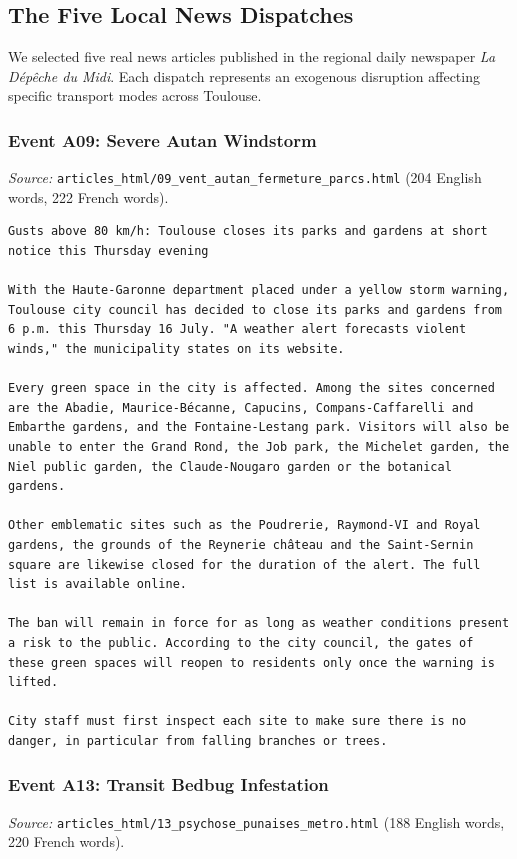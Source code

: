\subsection{The Five Local News Dispatches}

We selected five real news articles published in the regional daily newspaper \emph{La Dépêche du Midi}. Each dispatch represents an exogenous disruption affecting specific transport modes across Toulouse.

\subsubsection{Event A09: Severe Autan Windstorm}
\emph{Source:} \texttt{articles\_html/09\_vent\_autan\_fermeture\_parcs.html} (204 English words, 222 French words).

\begin{Verbatim}
Gusts above 80 km/h: Toulouse closes its parks and gardens at short notice this Thursday evening

With the Haute-Garonne department placed under a yellow storm warning, Toulouse city council has decided to close its parks and gardens from 6 p.m. this Thursday 16 July. "A weather alert forecasts violent winds," the municipality states on its website.

Every green space in the city is affected. Among the sites concerned are the Abadie, Maurice-Bécanne, Capucins, Compans-Caffarelli and Embarthe gardens, and the Fontaine-Lestang park. Visitors will also be unable to enter the Grand Rond, the Job park, the Michelet garden, the Niel public garden, the Claude-Nougaro garden or the botanical gardens.

Other emblematic sites such as the Poudrerie, Raymond-VI and Royal gardens, the grounds of the Reynerie château and the Saint-Sernin square are likewise closed for the duration of the alert. The full list is available online.

The ban will remain in force for as long as weather conditions present a risk to the public. According to the city council, the gates of these green spaces will reopen to residents only once the warning is lifted.

City staff must first inspect each site to make sure there is no danger, in particular from falling branches or trees.
\end{Verbatim}

\subsubsection{Event A13: Transit Bedbug Infestation}
\emph{Source:} \texttt{articles\_html/13\_psychose\_punaises\_metro.html} (188 English words, 220 French words).

